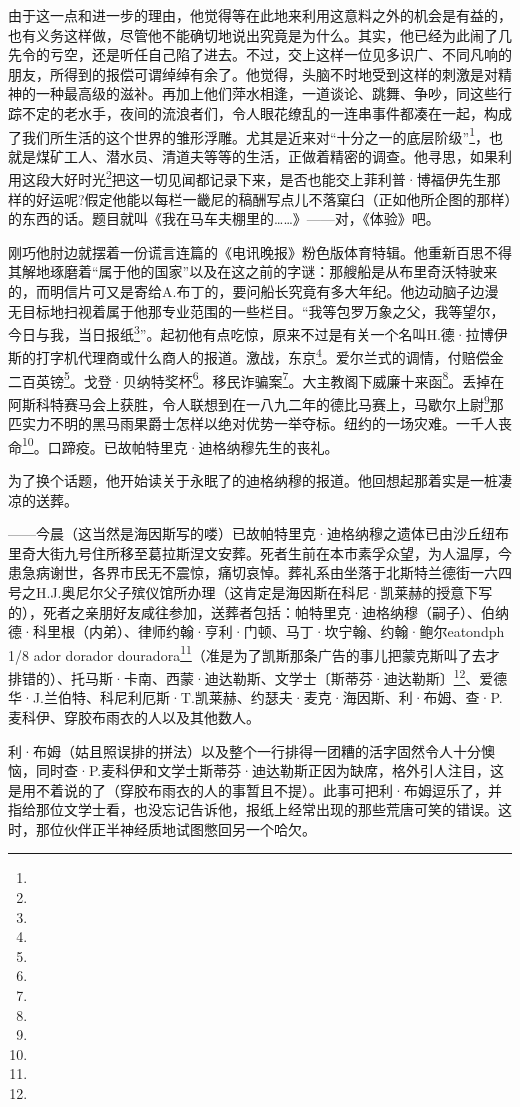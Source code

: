 \par 由于这一点和进一步的理由，他觉得等在此地来利用这意料之外的机会是有益的，也有义务这样做，尽管他不能确切地说出究竟是为什么。其实，他已经为此闹了几先令的亏空，还是听任自己陷了进去。不过，交上这样一位见多识广、不同凡响的朋友，所得到的报偿可谓绰绰有余了。他觉得，头脑不时地受到这样的刺激是对精神的一种最高级的滋补。再加上他们萍水相逢，一道谈论、跳舞、争吵，同这些行踪不定的老水手，夜间的流浪者们，令人眼花缭乱的一连串事件都凑在一起，构成了我们所生活的这个世界的雏形浮雕。尤其是近来对“十分之一的底层阶级”\footnote{}，也就是煤矿工人、潜水员、清道夫等等的生活，正做着精密的调查。他寻思，如果利用这段大好时光\footnote{}把这一切见闻都记录下来，是否也能交上菲利普·博福伊先生那样的好运呢?假定他能以每栏一畿尼的稿酬写点儿不落窠臼（正如他所企图的那样）的东西的话。题目就叫《我在马车夫棚里的……》——对，《体验》吧。
\par 刚巧他肘边就摆着一份谎言连篇的《电讯晚报》粉色版体育特辑。他重新百思不得其解地琢磨着“属于他的国家”以及在这之前的字谜：那艘船是从布里奇沃特驶来的，而明信片可又是寄给A.布丁的，要问船长究竟有多大年纪。他边动脑子边漫无目标地扫视着属于他那专业范围的一些栏目。“我等包罗万象之父，我等望尔，今日与我，当日报纸\footnote{}”。起初他有点吃惊，原来不过是有关一个名叫H.德·拉博伊斯的打字机代理商或什么商人的报道。激战，东京\footnote{}。爱尔兰式的调情，付赔偿金二百英镑\footnote{}。戈登·贝纳特奖杯\footnote{}。移民诈骗案\footnote{}。大主教阁下威廉十来函\footnote{}。丢掉在阿斯科特赛马会上获胜，令人联想到在一八九二年的德比马赛上，马歇尔上尉\footnote{}那匹实力不明的黑马雨果爵士怎样以绝对优势一举夺标。纽约的一场灾难。一千人丧命\footnote{}。口蹄疫。已故帕特里克·迪格纳穆先生的丧礼。
\par 为了换个话题，他开始读关于永眠了的迪格纳穆的报道。他回想起那着实是一桩凄凉的送葬。
\par ——今晨（这当然是海因斯写的喽）已故帕特里克·迪格纳穆之遗体已由沙丘纽布里奇大街九号住所移至葛拉斯涅文安葬。死者生前在本市素孚众望，为人温厚，今患急病谢世，各界市民无不震惊，痛切哀悼。葬礼系由坐落于北斯特兰德街一六四号之H.J.奥尼尔父子殡仪馆所办理（这肯定是海因斯在科尼·凯莱赫的授意下写的），死者之亲朋好友咸往参加，送葬者包括：帕特里克·迪格纳穆（嗣子）、伯纳德·科里根（内弟）、律师约翰·亨利·门顿、马丁·坎宁翰、约翰·鲍尔eatondph 1/8 ador dorador douradora\footnote{}（准是为了凯斯那条广告的事儿把蒙克斯叫了去才排错的）、托马斯·卡南、西蒙·迪达勒斯、文学士〔斯蒂芬·迪达勒斯〕\footnote{}、爱德华·J.兰伯特、科尼利厄斯·T.凯莱赫、约瑟夫·麦克·海因斯、利·布姆、查·P.麦科伊、穿胶布雨衣的人以及其他数人。
\par 利·布姆（姑且照误排的拼法）以及整个一行排得一团糟的活字固然令人十分懊恼，同时查·P.麦科伊和文学士斯蒂芬·迪达勒斯正因为缺席，格外引人注目，这是用不着说的了（穿胶布雨衣的人的事暂且不提）。此事可把利·布姆逗乐了，并指给那位文学士看，也没忘记告诉他，报纸上经常出现的那些荒唐可笑的错误。这时，那位伙伴正半神经质地试图憋回另一个哈欠。
